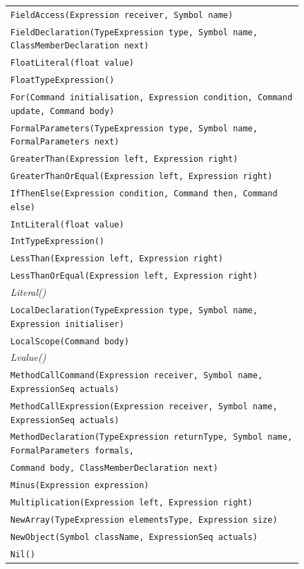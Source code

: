 \begin{figure}
\begin{center}
{\begin{tabular}{l}
\texttt{FieldAccess(Expression receiver, Symbol name)} \\
\texttt{FieldDeclaration(TypeExpression type, Symbol name, ClassMemberDeclaration next)} \\
\texttt{FloatLiteral(float value)} \\
\texttt{FloatTypeExpression()} \\
\texttt{For(Command initialisation, Expression condition, Command update, Command body)} \\
\texttt{FormalParameters(TypeExpression type, Symbol name, FormalParameters next)} \\
\texttt{GreaterThan(Expression left, Expression right)} \\
\texttt{GreaterThanOrEqual(Expression left, Expression right)} \\
\texttt{IfThenElse(Expression condition, Command then, Command else)} \\
\texttt{IntLiteral(float value)} \\
\texttt{IntTypeExpression()} \\
\texttt{LessThan(Expression left, Expression right)} \\
\texttt{LessThanOrEqual(Expression left, Expression right)} \\
\textit{Literal()} \\
\texttt{LocalDeclaration(TypeExpression type, Symbol name, Expression initialiser)} \\
\texttt{LocalScope(Command body)} \\
\textit{Lvalue()} \\
\texttt{MethodCallCommand(Expression receiver, Symbol name, ExpressionSeq actuals)} \\
\texttt{MethodCallExpression(Expression receiver, Symbol name, ExpressionSeq actuals)} \\
\texttt{MethodDeclaration(TypeExpression returnType, Symbol name, FormalParameters formals,}\\
\hspace*{21ex}\texttt{Command body, ClassMemberDeclaration next)} \\
\texttt{Minus(Expression expression)} \\
\texttt{Multiplication(Expression left, Expression right)} \\
\texttt{NewArray(TypeExpression elementsType, Expression size)} \\
\texttt{NewObject(Symbol className, ExpressionSeq actuals)} \\
\texttt{Nil()} \\

\end{tabular}}
\end{center}
\end{figure}
